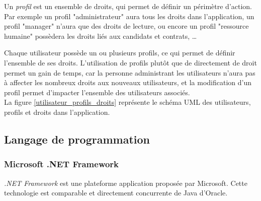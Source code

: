 Un \textit{profil} est un ensemble de droits, qui permet de définir un périmètre d'action. Par exemple un profil "administrateur" aura tous les droits dans l'application, un profil "manager" n'aura que des droits de lecture, ou encore un profil "ressource humaine" possèdera les droits liés aux candidats et contrats, \ldots

Chaque utilisateur possède un ou plusieurs profils, ce qui permet de définir l'ensemble de ses droits. L'utilisation de profils plutôt que de directement de droit permet un gain de temps, car la personne administrant les utilisateurs n'aura pas à affecter les nombreux droits aux nouveaux utilisateurs, et la modification d'un profil permet d'impacter l'ensemble des utilisateurs associés.
\\

La figure \ref{utilisateur_profils_droits} représente le schéma UML des utilisateurs, profils et droits dans l'application.


\subsection{Langage de programmation}


\subsubsection{Microsoft .NET Framework}

\textit{.NET Framework} est une plateforme application proposée par Microsoft. Cette technologie est comparable et directement concurrente de Java d'Oracle.

